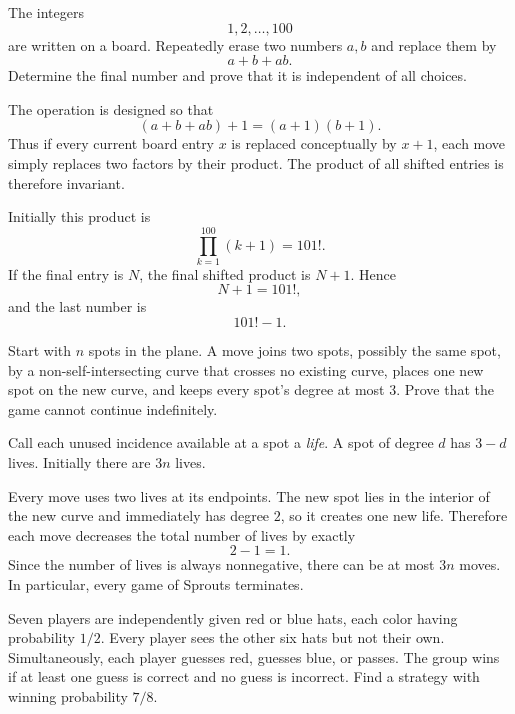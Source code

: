     \begin{expectedproblem}
        The integers
        \[
            1,2,\ldots,100
        \]
        are written on a board. Repeatedly erase two numbers $a,b$ and replace
        them by
        \[
            a+b+ab.
        \]
        Determine the final number and prove that it is independent of all
        choices.
    \end{expectedproblem}

    \begin{solution}
        The operation is designed so that
        \[
            (a+b+ab)+1=(a+1)(b+1).
        \]
        Thus if every current board entry $x$ is replaced conceptually by
        $x+1$, each move simply replaces two factors by their product. The
        product of all shifted entries is therefore invariant.

        Initially this product is
        \[
            \prod_{k=1}^{100}(k+1)=101!.
        \]
        If the final entry is $N$, the final shifted product is $N+1$. Hence
        \[
            N+1=101!,
        \]
        and the last number is
        \[
            \boxed{101!-1}.
        \]
    \end{solution}

    \begin{expectedproblem}[Sprouts]
        Start with $n$ spots in the plane. A move joins two spots, possibly the
        same spot, by a non-self-intersecting curve that crosses no existing
        curve, places one new spot on the new curve, and keeps every spot's
        degree at most $3$. Prove that the game cannot continue indefinitely.
    \end{expectedproblem}

    \begin{solution}
        Call each unused incidence available at a spot a \emph{life}. A spot of
        degree $d$ has $3-d$ lives. Initially there are $3n$ lives.

        Every move uses two lives at its endpoints. The new spot lies in the
        interior of the new curve and immediately has degree $2$, so it creates
        one new life. Therefore each move decreases the total number of lives by
        exactly
        \[
            2-1=1.
        \]
        Since the number of lives is always nonnegative, there can be at most
        $3n$ moves. In particular, every game of Sprouts terminates.
    \end{solution}

    \begin{expectedproblem}
        Seven players are independently given red or blue hats, each color
        having probability $1/2$. Every player sees the other six hats but not
        their own. Simultaneously, each player guesses red, guesses blue, or
        passes. The group wins if at least one guess is correct and no guess is
        incorrect. Find a strategy with winning probability $7/8$.
    \end{expectedproblem}

